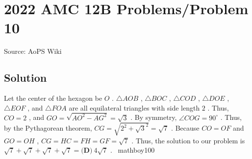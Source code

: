\documentclass[12pt]{article}
\begin{document}
\section*{{2022 AMC 12B Problems/Problem 10}}
Source: AoPS Wiki

\subsection*{Solution}
Let the center of the hexagon be $O$ . $\triangle AOB$ , $\triangle BOC$ , $\triangle COD$ , $\triangle DOE$ , $\triangle EOF$ , and $\triangle FOA$ are all equilateral triangles with side length $2$ . Thus, $CO = 2$ , and $GO = \sqrt{AO^2 - AG^2} = \sqrt{3}$ . By symmetry, $\angle COG = 90^{\circ}$ . Thus, by the Pythagorean theorem, $CG = \sqrt{2^2 + \sqrt{3}^2} = \sqrt{7}$ . Because $CO = OF$ and $GO = OH$ , $CG = HC = FH = GF = \sqrt{7}$ . Thus, the solution to our problem is $\sqrt{7} + \sqrt{7} + \sqrt{7} + \sqrt{7} = \boxed{\textbf{(D)}\ 4\sqrt7}$ . ~mathboy100
\end{document}
